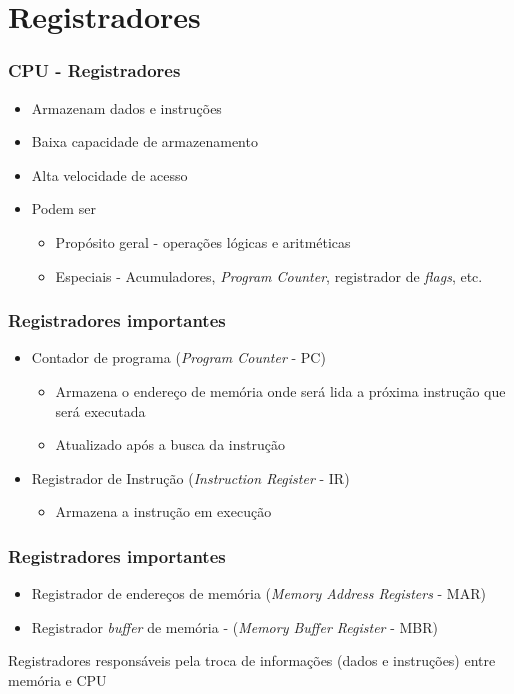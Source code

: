 \documentclass[aspectratio=169,
				xcolor=table]{beamer}
\begin{document}
	\section{Registradores}
		\begin{frame}
			\frametitle{CPU - Registradores}
			\begin{itemize}
				\item Armazenam dados e instruções
				\vspace{1em}
				\item Baixa capacidade de armazenamento
				\vspace{1em}
				\item Alta velocidade de acesso
				\vspace{1em}
				\item Podem ser
				\begin{itemize}
					\item Propósito geral - operações lógicas e aritméticas
					\item Especiais - Acumuladores, \textit{Program Counter}, registrador de \textit{flags}, etc.
				\end{itemize}
				
			\end{itemize}
		\end{frame}
		
		\begin{frame}
			\frametitle{Registradores importantes}
			\begin{itemize}
				\item Contador de programa (\textit{Program Counter} - PC)	
				\begin{itemize}
					\item Armazena o endereço de memória onde será lida a próxima instrução que será executada
					\item Atualizado após a busca da instrução
				\end{itemize}
				\vspace{1em}
				\item Registrador de Instrução (\textit{Instruction Register} - IR)
				\begin{itemize}
					\item Armazena a instrução em execução
				\end{itemize}
			\end{itemize}
		\end{frame}
		
		\begin{frame}
			\frametitle{Registradores importantes}
			\begin{itemize}
			 \item Registrador de endereços de memória (\textit{Memory Address Registers} - MAR)
			 \vspace{1em}
			 \item Registrador \textit{buffer} de memória - (\textit{Memory Buffer Register} - MBR)
			\end{itemize}
			
			\vspace{1em}
			\Large \alert{Registradores responsáveis pela troca de informações (dados e instruções) entre memória e CPU}
		\end{frame}
		
\end{document}
